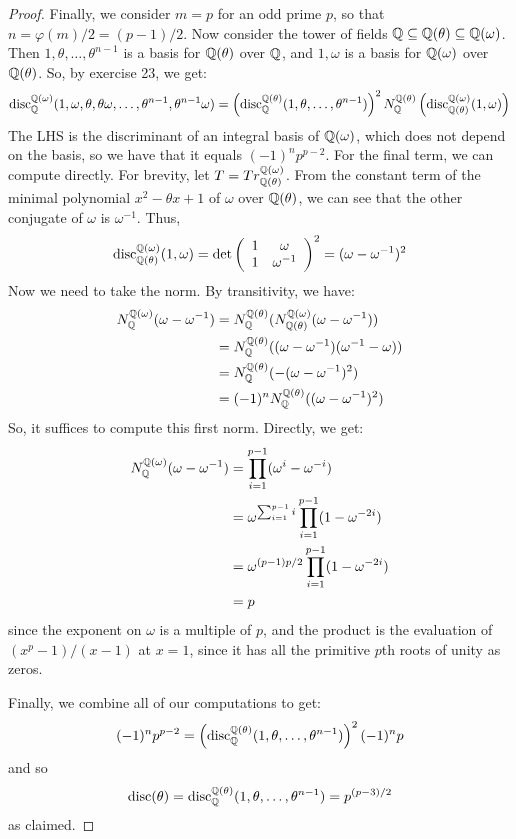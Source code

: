 \begin{proof}
    Finally, we consider $m=p$ for an odd prime $p$, so that $n = \varphi(m)/2 = (p-1)/2$. Now consider the tower of fields $\mathbb{Q} \subseteq \mathbb{Q}(\theta) \subseteq \mathbb{Q}(\omega)$. Then $1,\theta,\ldots,\theta^{n-1}$ is a basis for $\mathbb{Q}(\theta)$ over $\mathbb{Q}$, and $1,\omega$ is a basis for $\mathbb{Q}(\omega)$ over $\mathbb{Q}(\theta)$. So, by exercise 23, we get:
    \[ \operatorname{disc}_{\mathbb{Q}}^{\mathbb{Q}(\omega)}(1,\omega,\theta,\theta\omega,\ldots,\theta^{n-1},\theta^{n-1}\omega) = \left(\operatorname{disc}_{\mathbb{Q}}^{\mathbb{Q}(\theta)}(1,\theta,\ldots,\theta^{n-1})\right)^2N_{\mathbb{Q}}^{\mathbb{Q}(\theta)}\left(\operatorname{disc}_{\mathbb{Q}(\theta)}^{\mathbb{Q}(\omega)}(1,\omega)\right) \]
    The LHS is the discriminant of an integral basis of $\mathbb{Q}(\omega)$, which does not depend on the basis, so we have that it equals $(-1)^np^{p-2}$. For the final term, we can compute directly. For brevity, let $T = Tr_{\mathbb{Q}(\theta)}^{\mathbb{Q}(\omega)}$. From the constant term of the minimal polynomial $x^2 - \theta x + 1$ of $\omega$ over $\mathbb{Q}(\theta)$, we can see that the other conjugate of $\omega$ is $\omega^{-1}$. Thus,
    \[ \operatorname{disc}_{\mathbb{Q}(\theta)}^{\mathbb{Q}(\omega)}(1,\omega) = \det\left(\begin{array}{cc} 1 & \omega \\ 1 & \omega^{-1} \end{array}\right)^2 = (\omega-\omega^{-1})^2 \]
    Now we need to take the norm. By transitivity, we have:
    \begin{align*}
    N_{\mathbb{Q}}^{\mathbb{Q}(\omega)}(\omega-\omega^{-1})
        &= N_{\mathbb{Q}}^{\mathbb{Q}(\theta)}(N_{\mathbb{Q}(\theta)}^{\mathbb{Q}(\omega)}(\omega-\omega^{-1})) \\
        &= N_{\mathbb{Q}}^{\mathbb{Q}(\theta)}((\omega-\omega^{-1})(\omega^{-1}-\omega)) \\
        &= N_{\mathbb{Q}}^{\mathbb{Q}(\theta)}(-(\omega-\omega^{-1})^2) \\
        &= (-1)^nN_{\mathbb{Q}}^{\mathbb{Q}(\theta)}((\omega-\omega^{-1})^2)
    \end{align*}
    So, it suffices to compute this first norm. Directly, we get:
    \begin{align*}
    N_{\mathbb{Q}}^{\mathbb{Q}(\omega)}(\omega-\omega^{-1})
        &= \prod_{i=1}^{p-1} (\omega^i-\omega^{-i}) \\
        &= \omega^{\sum_{i=1}^{p-1} i}\prod_{i=1}^{p-1} (1-\omega^{-2i}) \\
        &= \omega^{(p-1)p/2}\prod_{i=1}^{p-1} (1-\omega^{-2i}) \\
        &= p
    \end{align*}
    since the exponent on $\omega$ is a multiple of $p$, and the product is the evaluation of $(x^p-1)/(x-1)$ at $x=1$, since it has all the primitive $p$th roots of unity as zeros.

    Finally, we combine all of our computations to get:
    \[ (-1)^np^{p-2} = \left(\operatorname{disc}_{\mathbb{Q}}^{\mathbb{Q}(\theta)}(1,\theta,\ldots,\theta^{n-1})\right)^2(-1)^np \]
    and so
    \[ \operatorname{disc}(\theta) = \operatorname{disc}_{\mathbb{Q}}^{\mathbb{Q}(\theta)}(1,\theta,\ldots,\theta^{n-1}) = p^{(p-3)/2} \]
    as claimed.
\end{proof}
